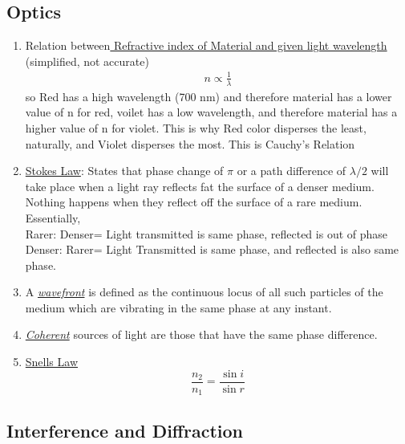 \documentclass[12pt]{article}
\begin{document}
\subsection{Optics}
\begin{enumerate}
	
	\item Relation between\underline{ Refractive index of Material and given light wavelength} (simplified, not accurate)
	\begin{eqnarray}
		n \propto \frac{1}{\lambda}
	\end{eqnarray}
	so Red has a high wavelength (700 nm) and therefore material has a lower value of n for red, voilet has a low wavelength, and therefore material has a higher value of n for violet. This is why Red color disperses the least, naturally, and Violet disperses the most. This is Cauchy's Relation
	
	\item \underline{Stokes Law}: States that phase change of \(\pi \) or a path difference of \(\lambda / 2 \) 
	will take place when a light ray reflects fat the surface of a denser medium. Nothing happens when they reflect off
	the surface of a rare medium.\\
	
	Essentially, \\
	Rarer: Denser= Light transmitted is same phase, reflected is out of phase\\
	Denser: Rarer= Light Transmitted is same phase, and reflected is also same phase.
	
	\item A \textit{\underline{wavefront}} is defined as the continuous locus of all such particles of the medium which are vibrating in the same phase at any instant. 
	
	\item \textit{\underline{Coherent}} sources of light are those that have the same phase difference.
	
	\item \underline{Snells Law}
	\begin{equation}
		\frac{n_2}{n_1} = \frac{\sin i}{\sin r}
	\end{equation}
	
\end{enumerate}



\subsection{Interference and Diffraction}
\end{document}
